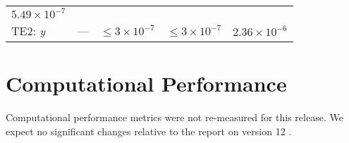 \documentclass[DM,toc]{lsstdoc}
\begin{document}
\begin{longtable}[]{@{}lllll@{}}
\begin{minipage}[t]{0.22\columnwidth}
\(5.49\times 10^{-7}\)\strut
\end{minipage}\tabularnewline
\begin{minipage}[t]{0.13\columnwidth}\raggedright\strut
TE2: \emph{y}\strut
\end{minipage} & \begin{minipage}[t]{0.05\columnwidth}\raggedright\strut
---\strut
\end{minipage} & \begin{minipage}[t]{0.24\columnwidth}\raggedright\strut
\(\leq 3\times 10^{-7}\)\strut
\end{minipage} & \begin{minipage}[t]{0.21\columnwidth}\raggedright\strut
\(\leq 3\times 10^{-7}\)\strut
\end{minipage} & \begin{minipage}[t]{0.22\columnwidth}\raggedright\strut
\(2.36\times 10^{-6}\)\strut
\end{minipage}\tabularnewline
\bottomrule
\end{longtable}

\section{Computational Performance}\label{computational-performance}

Computational performance metrics were not re-measured for this release.
We expect no significant changes relative to the
report on version 12 .



\end{document}
